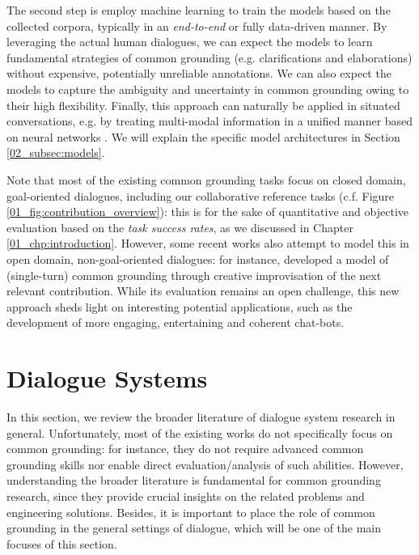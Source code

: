 The second step is employ machine learning \citep{murphy2012machine} to train the models based on the collected corpora, typically in an \textit{end-to-end} or fully data-driven manner. By leveraging the actual human dialogues, we can expect the models to learn fundamental strategies of common grounding (e.g. clarifications and elaborations) without expensive, potentially unreliable annotations. We can also expect the models to capture the ambiguity and uncertainty in common grounding owing to their high flexibility. Finally, this approach can naturally be applied in situated conversations, e.g. by treating multi-modal information in a unified manner based on neural networks \citep{GoodBengCour16}. We will explain the specific model architectures in Section \ref{02_subsec:models}.

Note that most of the existing common grounding tasks focus on closed domain, goal-oriented dialogues, including our collaborative reference tasks (c.f. Figure \ref{01_fig:contribution_overview}): this is for the sake of quantitative and objective evaluation based on the \textit{task success rates}, as we discussed in Chapter \ref{01_chp:introduction}. However, some recent works also attempt to model this in open domain, non-goal-oriented dialogues: for instance, \citet{cho-may-2020-grounding} developed a model of (single-turn) common grounding through creative improvisation of the next relevant contribution. While its evaluation remains an open challenge, this new approach sheds light on interesting potential applications, such as the development of more engaging, entertaining and coherent chat-bots.

\section{Dialogue Systems}
\label{02_sec:dialogue_systems}

In this section, we review the broader literature of dialogue system research in general. Unfortunately, most of the existing works do not specifically focus on common grounding: for instance, they do not require advanced common grounding skills nor enable direct evaluation/analysis of such abilities. However, understanding the broader literature is fundamental for common grounding research, since they provide crucial insights on the related problems and engineering solutions. Besides, it is important to place the role of common grounding in the general settings of dialogue, which will be one of the main focuses of this section.

